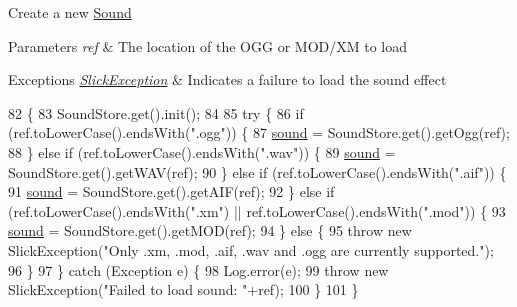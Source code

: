 Create a new \mbox{\hyperlink{classorg_1_1newdawn_1_1slick_1_1_sound}{Sound}}


\begin{DoxyParams}{Parameters}
{\em ref} & The location of the O\+GG or M\+O\+D/\+XM to load \\
\hline
\end{DoxyParams}

\begin{DoxyExceptions}{Exceptions}
{\em \mbox{\hyperlink{classorg_1_1newdawn_1_1slick_1_1_slick_exception}{Slick\+Exception}}} & Indicates a failure to load the sound effect \\
\hline
\end{DoxyExceptions}

\begin{DoxyCode}
82                                                    \{
83         SoundStore.get().init();
84         
85         \textcolor{keywordflow}{try} \{
86             \textcolor{keywordflow}{if} (ref.toLowerCase().endsWith(\textcolor{stringliteral}{".ogg"})) \{
87                 \mbox{\hyperlink{classorg_1_1newdawn_1_1slick_1_1_sound_aefd4460784b86c7003356f59cafe3dc8}{sound}} = SoundStore.get().getOgg(ref);
88             \} \textcolor{keywordflow}{else} \textcolor{keywordflow}{if} (ref.toLowerCase().endsWith(\textcolor{stringliteral}{".wav"})) \{
89                 \mbox{\hyperlink{classorg_1_1newdawn_1_1slick_1_1_sound_aefd4460784b86c7003356f59cafe3dc8}{sound}} = SoundStore.get().getWAV(ref);
90             \} \textcolor{keywordflow}{else} \textcolor{keywordflow}{if} (ref.toLowerCase().endsWith(\textcolor{stringliteral}{".aif"})) \{
91                 \mbox{\hyperlink{classorg_1_1newdawn_1_1slick_1_1_sound_aefd4460784b86c7003356f59cafe3dc8}{sound}} = SoundStore.get().getAIF(ref);
92             \} \textcolor{keywordflow}{else} \textcolor{keywordflow}{if} (ref.toLowerCase().endsWith(\textcolor{stringliteral}{".xm"}) || ref.toLowerCase().endsWith(\textcolor{stringliteral}{".mod"})) \{
93                 \mbox{\hyperlink{classorg_1_1newdawn_1_1slick_1_1_sound_aefd4460784b86c7003356f59cafe3dc8}{sound}} = SoundStore.get().getMOD(ref);
94             \} \textcolor{keywordflow}{else} \{
95                 \textcolor{keywordflow}{throw} \textcolor{keyword}{new} SlickException(\textcolor{stringliteral}{"Only .xm, .mod, .aif, .wav and .ogg are currently supported."});
96             \}
97         \} \textcolor{keywordflow}{catch} (Exception e) \{
98             Log.error(e);
99             \textcolor{keywordflow}{throw} \textcolor{keyword}{new} SlickException(\textcolor{stringliteral}{"Failed to load sound: "}+ref);
100         \}
101     \}
\end{DoxyCode}


